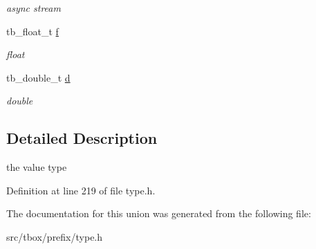 \begin{DoxyCompactItemize}
\begin{DoxyCompactList}\small\item\em async stream \end{DoxyCompactList}\item 
\hypertarget{uniontb__value__t_ac60882d4c02a59301d9d0c0293446d12}{tb\-\_\-float\-\_\-t \hyperlink{uniontb__value__t_ac60882d4c02a59301d9d0c0293446d12}{f}}\label{uniontb__value__t_ac60882d4c02a59301d9d0c0293446d12}

\begin{DoxyCompactList}\small\item\em float \end{DoxyCompactList}\item 
\hypertarget{uniontb__value__t_ad71c7e60c8df35d87eb89e5951051825}{tb\-\_\-double\-\_\-t \hyperlink{uniontb__value__t_ad71c7e60c8df35d87eb89e5951051825}{d}}\label{uniontb__value__t_ad71c7e60c8df35d87eb89e5951051825}

\begin{DoxyCompactList}\small\item\em double \end{DoxyCompactList}\end{DoxyCompactItemize}


\subsection{Detailed Description}
the value type 

Definition at line 219 of file type.\-h.



The documentation for this union was generated from the following file\-:\begin{DoxyCompactItemize}
\item 
src/tbox/prefix/type.\-h\end{DoxyCompactItemize}
